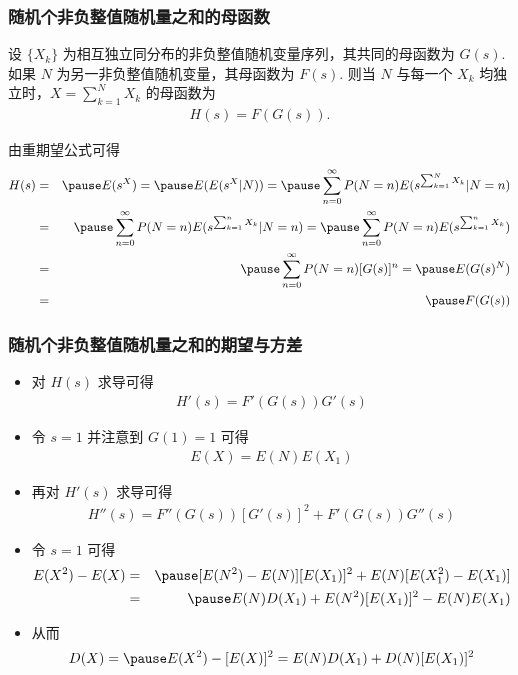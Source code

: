 \begin{frame}

	\frametitle{随机个非负整值随机量之和的母函数}
	\begin{thm}
		设 $\{X_k\}$ 为相互独立同分布的非负整值随机变量序列，其共同的母函数为 $G (s)$. 如果 $N$ 为另一非负整值随机变量，其母函数为 $F (s)$. 则当 $N$ 与每一个 $X_k$ 均独立时，$X=\sum_{k=1}^NX_k$ 的母函数为
		\begin{eqnarray*}
			H(s)=F(G(s)).
		\end{eqnarray*}

	\end{thm}

	\pause
	\zheng 由重期望公式可得
	\begin{eqnarray*}
		H(s)&=&\pause E(s^X)=\pause E(E(s^X|N))=\pause\sum_{n=0}^\infty P(N=n) E(s^{\sum_{k=1}^NX_k}|N=n)\\
		&=&\pause\sum_{n=0}^\infty P(N=n) E(s^{\sum_{k=1}^nX_k}|N=n)=\pause\sum_{n=0}^\infty P(N=n) E(s^{\sum_{k=1}^nX_k})\\
		&=&\pause\sum_{n=0}^\infty P(N=n)[G(s)]^n=\pause E(G(s)^N)\\
		&=&\pause F(G(s))
	\end{eqnarray*}

\end{frame}

\begin{frame}
	\frametitle{随机个非负整值随机量之和的期望与方差}
	\begin{itemize}[<+-|alert@+>]
		\item 对 $H (s)$ 求导可得
		\begin{eqnarray*}
			H'(s)=F'(G(s))G'(s)
		\end{eqnarray*}
		\item 令 $s=1$ 并注意到 $G (1)=1$ 可得
		\begin{eqnarray*}
			E(X)=E(N)E(X_1)
		\end{eqnarray*}
		\item 再对 $H'(s)$ 求导可得
		\begin{eqnarray*}
			H''(s)=F''(G(s))[G'(s)]^2+F'(G(s))G''(s)
		\end{eqnarray*}
		\item 令 $s=1$ 可得
		\begin{eqnarray*}
			E(X^2)-E(X)  &=&\pause \mbox{[}E(N^2)-E(N)][E(X_1)]^2+E(N)[E(X_1^2)-E(X_1)]\\
			&=&\pause  E(N)D(X_1)+E(N^2)[E(X_1)]^2-E(N)E(X_1)
		\end{eqnarray*}
		\item 从而
		\begin{eqnarray*}
			D(X)=\pause E(X^2)-[E(X)]^2=E(N)D(X_1)+D(N)[E(X_1)]^2
		\end{eqnarray*}
	\end{itemize}
\end{frame}





